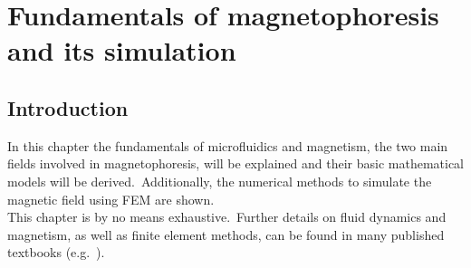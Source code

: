 \chapter{Fundamentals of magnetophoresis and its simulation}\label{ch:chapter2_theory}



\section{Introduction}
In this chapter the fundamentals of microfluidics and magnetism, the two main fields involved in magnetophoresis, will be explained and their basic mathematical models will be derived.\ Additionally, the numerical methods to simulate the magnetic field using FEM are shown.\\
This chapter is by no means exhaustive.\ Further details on fluid dynamics and magnetism, as well as finite element methods, can be found in many published textbooks (e.g.~\cite{White2006,Happel2012,Brenner2008,Cheng2012}).\
%
